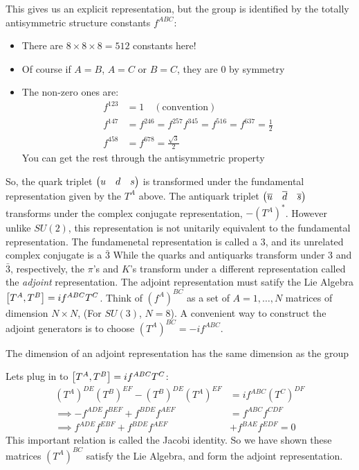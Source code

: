 This gives us an explicit representation, but the group is identified by the totally antisymmetric structure constants $f^{ABC}$:
\begin{itemize}
\item There are $8\times8\times8=512$ constants here!
\item Of course if $A=B$, $A=C$ or $B=C$, they are 0 by symmetry
\item The non-zero ones are:
  \begin{align*}
    f^{123}&=1\quad(\text{convention})\\
    f^{147}&=f^{246}=f^{257}f^{345}=f^{516}=f^{637}=\frac12\\
    f^{458}&=f^{678}=\frac{\sqrt{3}}{2}
  \end{align*}
  You can get the rest through the antisymmetric property
\end{itemize}
So, the quark triplet $\pmqty{u&d&s}$ is transformed under the fundamental representation given by the $T^A$ above. The antiquark triplet $\pmqty{\bar{u}&\bar{d}&\bar{s}}$ transforms under the complex conjugate representation, $-(T^A)^*$. However unlike $SU(2)$, this representation is not unitarily equivalent to the fundamental representation.
The fundamenetal representation is called a $3$, and its unrelated complex conjugate is a $\bar{3}$
While the quarks and antiquarks transform under 3 and $\bar{3}$, respectively, the $\pi$'s and $K$'s transform under a different representation called the \emph{adjoint} representation.
The adjoint representation must satify the Lie Algebra $\comm{T^A}{T^B}=if^{ABC}T^C$. Think of $(f^A)^{BC}$ as a set of $A=1,\dots,N$ matrices of dimension $N\times N$, (For $SU(3)$, $N=8$). A convenient way to construct the adjoint generators is to choose $(T^A)^{BC}=-if^{ABC}$.

\begin{definition}
  The dimension of an adjoint representation has the same dimension as the group
\end{definition}
Lets plug in to $\comm{T^A}{T^B}=if^{ABC}T^C$:
\begin{align*}
  (T^A)^{DE}(T^B)^{EF}-(T^B)^{DE}(T^A)^{EF}&=if^{ABC}(T^C)^{DF}\\
  \implies -f^{ADE}f^{BEF}+f^{BDE}f^{AEF}&=f^{ABC}f^{CDF}\\
  \implies f^{ADE}f^{EBF}+f^{BDE}f^{AEF}&+f^{BAE}f^{EDF}=0
\end{align*}
This important relation is called the Jacobi identity. So we have shown these matrices $(T^A)^{BC}$ satisfy the Lie Algebra, and form the adjoint representation.

